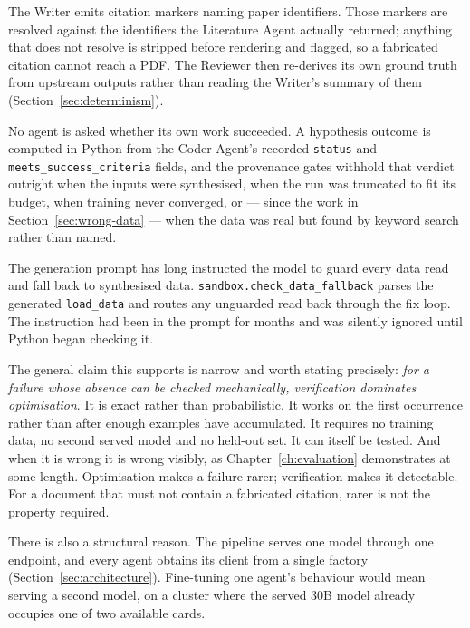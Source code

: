 \begin{description}[style=unboxed,leftmargin=0pt,itemsep=0.3em,font=\normalfont\bfseries]
  \item[Hallucination] The Writer emits citation markers naming paper
    identifiers. Those markers are resolved against the identifiers the
    Literature Agent actually returned; anything that does not resolve is
    stripped before rendering and flagged, so a fabricated citation cannot reach
    a PDF. The Reviewer then re-derives its own ground truth from upstream
    outputs rather than reading the Writer's summary of them
    (Section~\ref{sec:determinism}).
  \item[Poor self-evaluation] No agent is asked whether its own work succeeded.
    A hypothesis outcome is computed in Python from the Coder Agent's recorded
    \texttt{status} and \texttt{meets\_success\_criteria} fields, and the
    provenance gates withhold that verdict outright when the inputs were
    synthesised, when the run was truncated to fit its budget, when training
    never converged, or --- since the work in Section~\ref{sec:wrong-data} ---
    when the data was real but found by keyword search rather than named.
  \item[Instruction following] The generation prompt has long instructed the
    model to guard every data read and fall back to synthesised data.
    \texttt{sandbox.check\_data\_fallback} parses the generated
    \texttt{load\_data} and routes any unguarded read back through the fix loop.
    The instruction had been in the prompt for months and was silently ignored
    until Python began checking it.
\end{description}

The general claim this supports is narrow and worth stating precisely: \emph{for
a failure whose absence can be checked mechanically, verification dominates
optimisation}. It is exact rather than probabilistic. It works on the first
occurrence rather than after enough examples have accumulated. It requires no
training data, no second served model and no held-out set. It can itself be
tested. And when it is wrong it is wrong visibly, as Chapter~\ref{ch:evaluation}
demonstrates at some length. Optimisation makes a failure rarer; verification
makes it detectable. For a document that must not contain a fabricated citation,
rarer is not the property required.

There is also a structural reason. The pipeline serves one model through one
endpoint, and every agent obtains its client from a single factory
(Section~\ref{sec:architecture}). Fine-tuning one agent's behaviour would mean
serving a second model, on a cluster where the served 30B model already occupies
one of two available cards.

